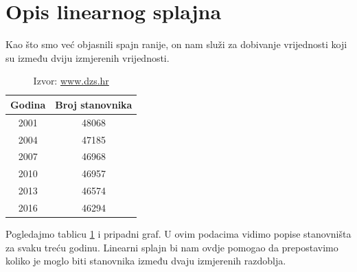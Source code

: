 \documentclass[12pt,a4paper]{report}
\begin{document}
	\section{Opis linearnog splajna}
	
	Kao što smo već objasnili spajn ranije, on nam služi za dobivanje vrijednosti koji su između dviju izmjerenih vrijednosti.
	
	\begin{minipage}{0.4\textwidth}
	\begin{table}[H]
		\begin{tabular}{c c}
			Godina&Broj stanovnika\\\hline
			2001	&	48068	\\
			2004	&	47185	\\
			2007	&	46968	\\
			2010	&	46957	\\
			2013	&	46574	\\
			2016	&	46294	\\
			
		\end{tabular}
	\caption{Izvor: \url{www.dzs.hr}}
	\label{dzsStan}
	\end{table}
	\end{minipage}
	\begin{minipage}{0.6\textwidth}

	
	\end{minipage}
	Pogledajmo tablicu \ref{dzsStan} i pripadni graf. U ovim podacima vidimo popise stanovništa za svaku treću godinu. Linearni splajn bi nam ovdje pomogao da prepostavimo koliko je moglo biti stanovnika između dvaju izmjerenih razdoblja.
	
\end{document}
